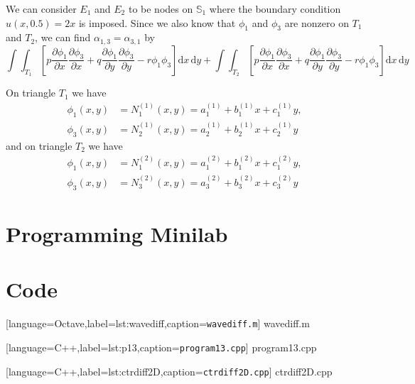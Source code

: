 \documentclass[12pt]{article}
\newcommand{\dd}[1]{\mathrm{d}{#1}}
\begin{document}
We can consider $E_1$ and $E_2$ to be nodes on $\mathbb{S}_1$ where
the boundary condition $u(x,0.5)=2x$ is imposed. Since we also know
that $\phi_1$ and $\phi_3$ are nonzero on $T_1$ and $T_2$, we can find
$\alpha_{1,3}=\alpha_{3,1}$ by
\begin{equation}
  \label{eq:1_alpha_1_3}
  \int\int_{T_1}\left[
  p\frac{\partial\phi_1}{\partial x}\frac{\partial\phi_3}{\partial x} + 
  q\frac{\partial\phi_1}{\partial y}\frac{\partial\phi_3}{\partial y} -
  r\phi_1\phi_3\right] \dd{x}\,\dd{y} +
\int\int_{T_2}\left[
  p\frac{\partial\phi_1}{\partial x}\frac{\partial\phi_3}{\partial x} + 
  q\frac{\partial\phi_1}{\partial y}\frac{\partial\phi_3}{\partial y} -
  r\phi_1\phi_3\right] \dd{x}\,\dd{y}
\end{equation}

On triangle $T_1$ we have
\begin{equation}
  \label{eq:1_t1_phi}
  \begin{aligned}
    \phi_1(x,y) &= N_1^{(1)}(x,y) = a_1^{(1)} + b_1^{(1)}x + c_1^{(1)}y,\\ 
    \phi_3(x,y) &= N_2^{(1)}(x,y) = a_2^{(1)} + b_2^{(1)}x + c_2^{(1)}y 
  \end{aligned}
\end{equation}
and on triangle $T_2$ we have
\begin{equation}
  \label{eq:1_t2_phi}
  \begin{aligned}
    \phi_1(x,y) &= N_1^{(2)}(x,y) = a_1^{(2)} + b_1^{(2)}x + c_1^{(2)}y,\\ 
    \phi_3(x,y) &= N_3^{(2)}(x,y) = a_3^{(2)} + b_3^{(2)}x + c_3^{(2)}y 
  \end{aligned}
\end{equation}
\section{Programming Minilab}
\pagebreak
\section{Code}

[language=Octave,label=lst:wavediff,caption=\texttt{wavediff.m}]
{wavediff.m}
\pagebreak

[language=C++,label=lst:p13,caption=\texttt{program13.cpp}]
{program13.cpp}
\pagebreak

[language=C++,label=lst:ctrdiff2D,caption=\texttt{ctrdiff2D.cpp}]
{ctrdiff2D.cpp}
\end{document}

